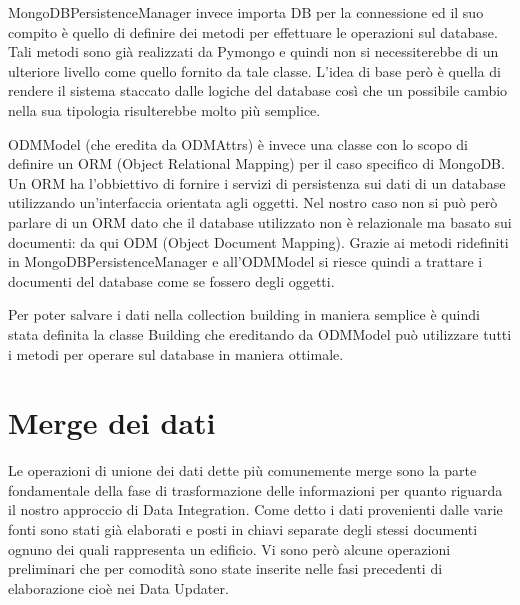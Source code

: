 \documentclass[12pt]{report}
\begin{document}
MongoDBPersistenceManager invece importa DB per la connessione ed il suo compito è quello di definire dei metodi per effettuare le operazioni sul database.
Tali metodi sono già realizzati da Pymongo e quindi non si necessiterebbe di un ulteriore livello come quello fornito da tale classe.
L'idea di base però è quella di rendere il sistema staccato dalle logiche del database così che un possibile cambio nella sua tipologia risulterebbe molto più semplice.

ODMModel (che eredita da ODMAttrs) è invece una classe con lo scopo di definire un ORM (Object Relational Mapping) per il caso specifico di MongoDB.
Un ORM ha l'obbiettivo di fornire i servizi di persistenza sui dati di un database utilizzando un'interfaccia orientata agli oggetti.
Nel nostro caso non si può però parlare di un ORM dato che il database utilizzato non è relazionale ma basato sui documenti: da qui ODM (Object Document Mapping).
Grazie ai metodi ridefiniti in MongoDBPersistenceManager e all'ODMModel si riesce quindi a trattare i documenti del database come se fossero degli oggetti.

Per poter salvare i dati nella collection building in maniera semplice è quindi stata definita la classe Building che ereditando da ODMModel può utilizzare tutti i metodi per operare sul database in maniera ottimale.


\newpage
\section{Merge dei dati}

Le operazioni di unione dei dati dette più comunemente merge sono la parte fondamentale della fase di trasformazione delle informazioni per quanto riguarda il nostro approccio di Data Integration.
Come detto i dati provenienti dalle varie fonti sono stati già elaborati e posti in chiavi separate degli stessi documenti ognuno dei quali rappresenta un edificio.
Vi sono però alcune operazioni preliminari che per comodità sono state inserite nelle fasi precedenti di elaborazione cioè nei Data Updater.
\end{document}
